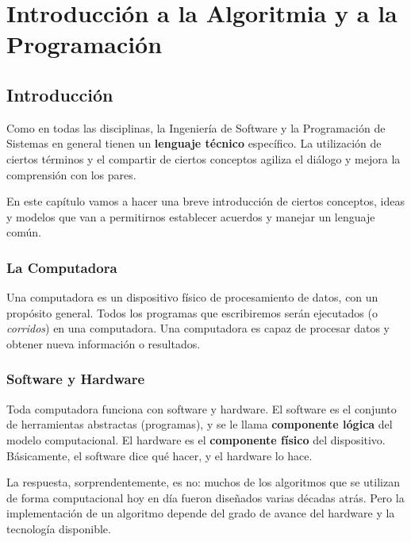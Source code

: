 \documentclass[
  letterpaper,
  DIV=11,
  numbers=noendperiod]{scrreprt}
\begin{document}

\chapter{Introducción a la Algoritmia y a la
Programación}\label{introducciuxf3n-a-la-algoritmia-y-a-la-programaciuxf3n}

\section{Introducción}\label{introducciuxf3n}

Como en todas las disciplinas, la Ingeniería de Software y la
Programación de Sistemas en general tienen un \textbf{lenguaje técnico}
específico. La utilización de ciertos términos y el compartir de ciertos
conceptos agiliza el diálogo y mejora la comprensión con los pares.

En este capítulo vamos a hacer una breve introducción de ciertos
conceptos, ideas y modelos que van a permitirnos establecer acuerdos y
manejar un lenguaje común.

\subsection{La Computadora}\label{la-computadora}

Una computadora es un dispositivo físico de procesamiento de datos, con
un propósito general. Todos los programas que escribiremos serán
ejecutados (o \emph{corridos}) en una computadora. Una computadora es
capaz de procesar datos y obtener nueva información o resultados.

\subsection{Software y Hardware}\label{software-y-hardware}

Toda computadora funciona con software y hardware. El software es el
conjunto de herramientas abstractas (programas), y se le llama
\textbf{componente lógica} del modelo computacional. El hardware es el
\textbf{componente físico} del dispositivo. Básicamente, el software
dice qué hacer, y el hardware lo hace.

\begin{tcolorbox}[enhanced jigsaw, opacityback=0, coltitle=black, toptitle=1mm, colframe=quarto-callout-tip-color-frame, leftrule=.75mm, colback=white, opacitybacktitle=0.6, toprule=.15mm, breakable, bottomrule=.15mm, rightrule=.15mm, bottomtitle=1mm, titlerule=0mm, title=\textcolor{quarto-callout-tip-color}{\faLightbulb}\hspace{0.5em}{\textbf{¿Es indispensable tener una computadora para crear un
algoritmo?}\\
}, colbacktitle=quarto-callout-tip-color!10!white, left=2mm, arc=.35mm]

La respuesta, sorprendentemente, es no: muchos de los algoritmos que se
utilizan de forma computacional hoy en día fueron diseñados varias
décadas atrás. Pero la implementación de un algoritmo depende del grado
de avance del hardware y la tecnología disponible.

\end{tcolorbox}
\end{document}

